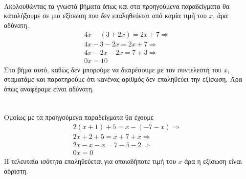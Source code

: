 \lysh\\
Ακολουθώντας τα γνωστά βήματα όπως και στα προηγούμενα παραδείγματα θα καταλήξουμε σε μια εξίσωση που δεν επαληθεύεται από καμία τιμή του $ x $, άρα αδύνατη.
\begin{gather*}
4x-(3+2x)=2x+7\Rightarrow\\
4x-3-2x=2x+7\Rightarrow\\
4x-2x-2x=7+3\Rightarrow\\
0x=10
\end{gather*}
Στο βήμα αυτό, καθώς δεν μπορούμε να διαιρέσουμε με τον συντελεστή του $ x $, σταματάμε και παρατηρούμε ότι κανένας αριθμός δεν επαληθεύει την εξίσωση. Άρα όπως αναφέραμε είναι αδύνατη.\\\\
\lysh\\
Ομοίως με τα προηγούμενα παραδείγματα θα έχουμε
\begin{gather*}
2(x+1)+5=x-(-7-x)\Rightarrow\\
2x+2+5=x+7+x\Rightarrow\\
2x-x-x=7-5-2\Rightarrow\\
0x=0
\end{gather*}
Η τελευταία ισότητα επαληθεύεται για οποιαδήποτε τιμή του $ x $ άρα η εξίσωση είναι αόριστη.
